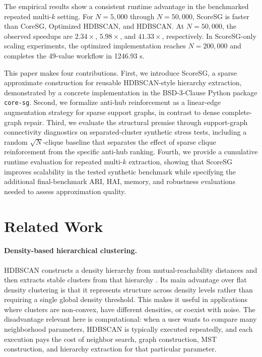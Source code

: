 \documentclass[11pt]{article}
\begin{document}
The empirical results show a consistent runtime advantage in the benchmarked repeated multi-\(k\) setting. For \(N=5{,}000\) through \(N=50{,}000\), ScoreSG is faster than CoreSG, Optimized HDBSCAN, and HDBSCAN. At \(N=50{,}000\), the observed speedups are \(2.34\times\), \(5.98\times\), and \(41.33\times\), respectively. In ScoreSG-only scaling experiments, the optimized implementation reaches \(N=200{,}000\) and completes the 49-value workflow in 1246.93 s.

This paper makes four contributions. First, we introduce ScoreSG, a sparse approximate construction for reusable HDBSCAN-style hierarchy extraction, demonstrated by a concrete implementation in the BSD-3-Clause Python package \texttt{core-sg}. Second, we formalize anti-hub reinforcement as a linear-edge augmentation strategy for sparse support graphs, in contrast to dense complete-graph repair. Third, we evaluate the structural premise through support-graph connectivity diagnostics on separated-cluster synthetic stress tests, including a random \(\sqrt{N}\)-clique baseline that separates the effect of sparse clique reinforcement from the specific anti-hub ranking. Fourth, we provide a cumulative runtime evaluation for repeated multi-\(k\) extraction, showing that ScoreSG improves scalability in the tested synthetic benchmark while specifying the additional final-benchmark ARI, HAI, memory, and robustness evaluations needed to assess approximation quality.

\section{Related Work}

\paragraph{Density-based hierarchical clustering.}
HDBSCAN constructs a density hierarchy from mutual-reachability distances and then extracts stable clusters from that hierarchy \citep{campello2013density,campello2015hierarchical}. Its main advantage over flat density clustering is that it represents structure across density levels rather than requiring a single global density threshold. This makes it useful in applications where clusters are non-convex, have different densities, or coexist with noise. The disadvantage relevant here is computational: when a user wants to compare many neighborhood parameters, HDBSCAN is typically executed repeatedly, and each execution pays the cost of neighbor search, graph construction, MST construction, and hierarchy extraction for that particular parameter.
\end{document}

